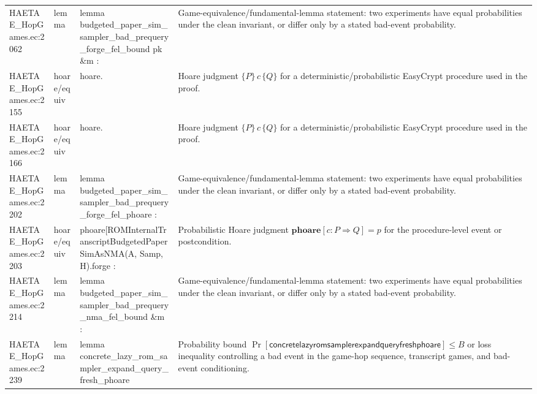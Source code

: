 \documentclass[10pt]{article}
\begin{document}
\begin{longtable}{L{0.11\textwidth}L{0.055\textwidth}L{0.385\textwidth}L{0.41\textwidth}}
HAETAE\_\allowbreak{}HopGames.\allowbreak{}ec:\allowbreak{}2062 & lemma & {\ttfamily\scriptsize lemma budgeted\_\allowbreak{}paper\_\allowbreak{}sim\_\allowbreak{}sampler\_\allowbreak{}bad\_\allowbreak{}prequery\_\allowbreak{}forge\_\allowbreak{}fel\_\allowbreak{}bound pk \&m :} & Game-equivalence/fundamental-lemma statement: two experiments have equal probabilities under the clean invariant, or differ only by a stated bad-event probability. \\
HAETAE\_\allowbreak{}HopGames.\allowbreak{}ec:\allowbreak{}2155 & hoare/equiv & {\ttfamily\scriptsize hoare.} & Hoare judgment $\{P\}\,c\,\{Q\}$ for a deterministic/probabilistic EasyCrypt procedure used in the proof. \\
HAETAE\_\allowbreak{}HopGames.\allowbreak{}ec:\allowbreak{}2166 & hoare/equiv & {\ttfamily\scriptsize hoare.} & Hoare judgment $\{P\}\,c\,\{Q\}$ for a deterministic/probabilistic EasyCrypt procedure used in the proof. \\
HAETAE\_\allowbreak{}HopGames.\allowbreak{}ec:\allowbreak{}2202 & lemma & {\ttfamily\scriptsize lemma budgeted\_\allowbreak{}paper\_\allowbreak{}sim\_\allowbreak{}sampler\_\allowbreak{}bad\_\allowbreak{}prequery\_\allowbreak{}forge\_\allowbreak{}fel\_\allowbreak{}phoare :} & Game-equivalence/fundamental-lemma statement: two experiments have equal probabilities under the clean invariant, or differ only by a stated bad-event probability. \\
HAETAE\_\allowbreak{}HopGames.\allowbreak{}ec:\allowbreak{}2203 & hoare/equiv & {\ttfamily\scriptsize phoare[ROMInternalTranscriptBudgetedPaperSimAsNMA(A, Samp, H).forge :} & Probabilistic Hoare judgment $\mathbf{phoare}[c:P\Rightarrow Q]=p$ for the procedure-level event or postcondition. \\
HAETAE\_\allowbreak{}HopGames.\allowbreak{}ec:\allowbreak{}2214 & lemma & {\ttfamily\scriptsize lemma budgeted\_\allowbreak{}paper\_\allowbreak{}sim\_\allowbreak{}sampler\_\allowbreak{}bad\_\allowbreak{}prequery\_\allowbreak{}nma\_\allowbreak{}fel\_\allowbreak{}bound \&m :} & Game-equivalence/fundamental-lemma statement: two experiments have equal probabilities under the clean invariant, or differ only by a stated bad-event probability. \\
HAETAE\_\allowbreak{}HopGames.\allowbreak{}ec:\allowbreak{}2239 & lemma & {\ttfamily\scriptsize lemma concrete\_\allowbreak{}lazy\_\allowbreak{}rom\_\allowbreak{}sampler\_\allowbreak{}expand\_\allowbreak{}query\_\allowbreak{}fresh\_\allowbreak{}phoare} & Probability bound $\Pr[\mathsf{concretelazyromsamplerexpandqueryfreshphoare}]\le B$ or loss inequality controlling a bad event in the game-hop sequence, transcript games, and bad-event conditioning. \\

\end{longtable}
\end{document}
